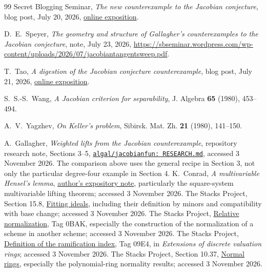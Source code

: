 \documentclass[11pt]{article}
\numberwithin{equation}{section}
\theoremstyle{plain}
\theoremstyle{definition}
\theoremstyle{remark}
\begin{document}
\begin{thebibliography}{99}
Secret Blogging Seminar,
\emph{The new counterexample to the Jacobian conjecture}, blog post, July 20,
2026,
\href{https://sbseminar.wordpress.com/2026/07/20/the-new-counterexample-to-the-jacobian-conjecture/}{online exposition}.

D.~E.~Speyer,
\emph{The geometry and structure of Gallagher's counterexamples to the Jacobian
conjecture}, note, July 23, 2026,
\url{https://sbseminar.wordpress.com/wp-content/uploads/2026/07/jacobiantangentsweep.pdf}.

T.~Tao,
\emph{A digestion of the Jacobian conjecture counterexample}, blog post, July 21,
2026,
\href{https://terrytao.wordpress.com/2026/07/21/a-digestion-of-the-jacobian-conjecture-counterexample/}{online exposition}.

S.~S.-S.~Wang,
\emph{A Jacobian criterion for separability},
J. Algebra \textbf{65} (1980), 453--494.

A.~V.~Yagzhev,
\emph{On Keller's problem},
Sibirsk. Mat. Zh. \textbf{21} (1980), 141--150.

 A.~Gallagher, \emph{Weighted lifts from the Jacobian
counterexample}, repository research note, Sections 3--5,
\href{https://github.com/algal/jacobianfun/blob/main/RESEARCH.md}{\texttt{algal/jacobianfun: RESEARCH.md}},
accessed 3 November 2026. The comparison above uses the general recipe in
Section 3, not only the particular degree-four example in Section 4.
 K.~Conrad, \emph{A multivariable Hensel's lemma},
\href{https://kconrad.math.uconn.edu/blurbs/gradnumthy/multivarhensel.pdf}{author's expository note},
particularly the square-system multivariable lifting theorem; accessed
3 November 2026.
 The Stacks Project, Section 15.8,
\href{https://stacks.math.columbia.edu/tag/07Z6}{Fitting ideals},
including their definition by minors and compatibility with base change;
accessed 3 November 2026.
 The Stacks Project,
\href{https://stacks.math.columbia.edu/tag/0BAK}{Relative normalization},
Tag 0BAK, especially the construction of the normalization of a scheme
in another scheme; accessed 3 November 2026.
 The Stacks Project,
\href{https://stacks.math.columbia.edu/tag/09E4}{Definition of the ramification index},
Tag 09E4, in \emph{Extensions of discrete valuation rings};
accessed 3 November 2026.
 The Stacks Project, Section 10.37,
\href{https://stacks.math.columbia.edu/tag/037B}{Normal rings},
especially the polynomial-ring normality results; accessed 3 November 2026.
\end{thebibliography}
\end{document}
